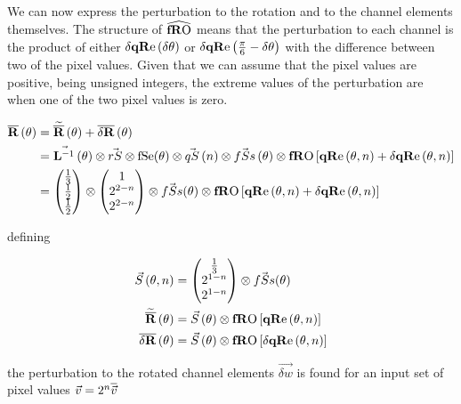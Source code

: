 We can now express the perturbation to the rotation and to the channel elements themselves. The structure of $\fROm$ means that the perturbation to each channel is the product of either $\dqRe[ \thetaA ]$ or $\dqRe[ \Pii{6} -\thetaA]$ with the difference between two of the pixel values. Given that we can assume that the pixel values are positive, being unsigned integers, the extreme values of the perturbation are when one of the two pixel values is zero.  

\begin{align*}
\nR[\theta] & = \nRa[\theta]+\dnR[\theta] \\
& = \nS[\theta] \otimes \rS \otimes \fSe (\theta) \otimes\qS[ n ] \otimes \fSs[\theta]  \otimes \fRO \left[ \qRe[ \theta, n ]  + \dqRe[ \theta, n ]  \right]  \\
& = 
\begin{pmatrix}
 \frac{1}{3}  \\
 \frac{1}{2}\\
 \frac{1}{2} \\
\end{pmatrix}
 \otimes
\begin{pmatrix}
 1  \\
 2^{2-n } \\
 2^{2-n }  \\
\end{pmatrix}
\otimes  \fSs(\theta) \otimes \fRO \left[ \qRe[ \theta, n ]  + \dqRe[ \theta, n ]  \right]   \\
\end{align*}


defining

\begin{align}\label{eq:scaleDef}
\Scale[\theta, n]   & =
\begin{pmatrix}
  \frac{1}{3} \\
 2^{1-n } \\
 2^{1-n }  \\
\end{pmatrix}
\otimes  \fSs(\theta)    \\
\nRa[\theta]   & =  \Scale[\theta] \otimes \fRO \left[   \qRe[ \theta, n ] \right]   \\
\dnR[\theta]   & =  \Scale[\theta] \otimes \fRO \left[ \dqRe[ \theta, n ] \right] \\
\end{align}

\newcommand{\rgb}{\vec{v}}
\newcommand{\w}{\vec{w}}
\newcommand{\dW}{\vec{\delta w}}

the perturbation to the rotated channel elements $\dW$ is found for an input set of pixel values $\rgb= 2^n\normed{\rgb} $

